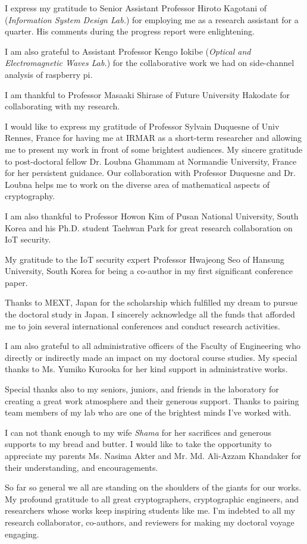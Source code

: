I express my gratitude to Senior Assistant Professor Hiroto Kagotani of (\textit{Information System Design Lab.}) for employing me as a research assistant for a quarter. 
His comments during the progress report were enlightening.


I am also grateful to Assistant Professor Kengo Iokibe (\textit{Optical and Electromagnetic Waves Lab.}) for the collaborative work we had on side-channel analysis of raspberry pi.

I am thankful to Professor Masaaki Shirase of Future University Hakodate for collaborating with my research.

I would like to express my gratitude of Professor Sylvain Duquesne of  Univ  Rennes, France for having me at IRMAR as a short-term researcher and allowing me to present my work in front of some brightest audiences.
My sincere gratitude to post-doctoral fellow Dr. Loubna Ghammam at Normandie University, France for her persistent guidance.
Our collaboration with  Professor Duquesne and Dr. Loubna helps me to work on the diverse area of mathematical aspects of cryptography.


I am also thankful to Professor Howon Kim of Pusan National University, South Korea and his Ph.D. student Taehwan Park for great research collaboration on IoT security.

My gratitude to the IoT security expert Professor Hwajeong Seo of Hansung University, South Korea for being a co-author in my first significant conference paper.


Thanks to MEXT, Japan for the scholarship which fulfilled my dream to pursue the doctoral study in Japan.
I sincerely acknowledge all the funds that afforded me to join several international conferences and conduct research activities.


I am also grateful to all administrative officers of the Faculty of Engineering who directly or indirectly made an impact on my doctoral course studies. My special thanks to Ms. Yumiko Kurooka for her kind support in administrative works.


Special thanks also to my seniors, juniors, and friends in the laboratory for creating a great work atmosphere and their generous support.  
Thanks to pairing team members of my lab who are one of the brightest minds I've worked with.

I can not thank enough to my wife \textit{Shama} for her sacrifices and generous supports to my bread and butter. 
I would like to take the opportunity to appreciate my parents Ms. Nasima Akter and Mr. Md. Ali-Azzam Khandaker for their understanding, and encouragements.


So far so general we all are standing on the shoulders of the giants for our works. 
My profound gratitude to all great cryptographers, cryptographic engineers, and researchers whose works keep inspiring students like me.
I'm indebted to all my research collaborator, co-authors, and reviewers for making my doctoral voyage engaging.
